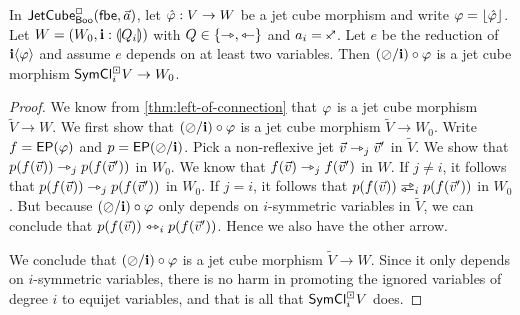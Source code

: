 \documentclass[a4paper]{memoir}
\begin{document}
\begin{corollary} \label{thm:weaken-connection}
	In $\mathsf{JetCube}^{\Box}_{\mathsf{Boo}}\mathopen{}\left( {\mathsf{fbe}},\vec a \right)\mathclose{}$, let $\hat {\varphi} : V \to W$ be a jet cube morphism and write $\varphi = \mathopen{}\left\lfloor \hat {\varphi} \right\rfloor\mathclose{}$.
	Let $W = (W_0, \mathbf{i} : {\llparenthesis Q_i \rrparenthesis})$ with $Q \in \mathopen{}\left\{ \rightarrowtriangle, \leftarrowtriangle \right\}\mathclose{}$ and $a_i = \ypolar$.
	Let $e$ be the reduction of $\mathbf{i} \langle \varphi \rangle$ and assume $e$ depends on at least two variables.
	Then $(\oslash/\mathbf{i}) \circ \varphi$ is a jet cube morphism $\mathsf{SymCl}^\boxdot_i V \to W_0$.
\end{corollary}
\begin{proof}
	We know from \cref{thm:left-of-connection} that $\varphi$ is a jet cube morphism $\tilde V \to W$.
	We first show that $(\oslash / \mathbf{i}) \circ \varphi$ is a jet cube morphism $\tilde V \to W_0$.
	Write $f = \mathsf{EP}(\varphi)$ and $p = \mathsf{EP}(\oslash / \mathbf{i})$.
	Pick a non-reflexive jet $\vec v \rightarrowtriangle_j \vec v'$ in $\tilde{V}$.
	We show that $p(f(\vec v)) \rightarrowtriangle_j p(f(\vec v'))$ in $W_0$.
	We know that $f(\vec v) \rightarrowtriangle_j f(\vec v')$ in $W$.
	If $j \neq i$, it follows that $p(f(\vec v)) \rightarrowtriangle_j p(f(\vec v'))$ in $W_0$.
	If $j = i$, it follows that $p(f(\vec v)) \infrajet_i p(f(\vec v'))$ in $W_0$.
	But because $(\oslash/\mathbf{i}) \circ \varphi$ only depends on $i$-symmetric variables in $\tilde{V}$, we can conclude that $p(f(\vec v)) \leftrightarrowtriangle_i p(f(\vec v'))$.
	Hence we also have the other arrow.
	
	We conclude that $(\oslash/\mathbf{i}) \circ \varphi$ is a jet cube morphism $\tilde V \to W$.
	Since it only depends on $i$-symmetric variables, there is no harm in promoting the ignored variables of degree $i$ to equijet variables, and that is all that $\mathsf{SymCl}^\boxdot_i V$ does.
\end{proof}
\end{document}
